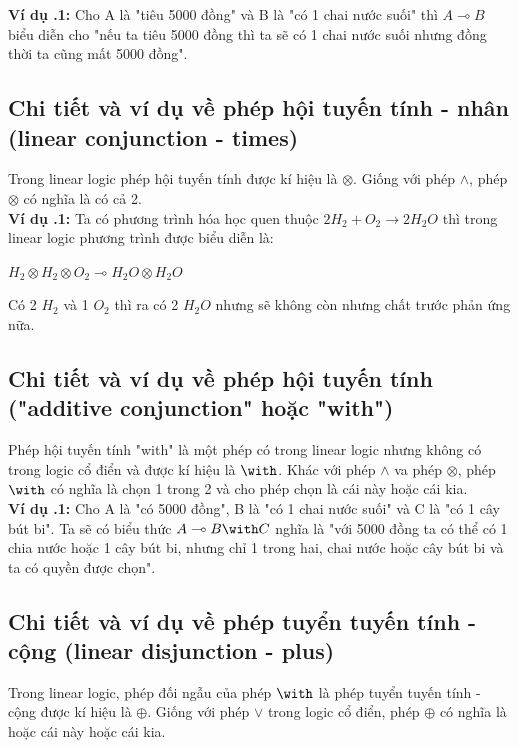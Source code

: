 \documentclass[a4paper]{article}
\begin{document}
\textbf{Ví dụ \thesubsection.1:} Cho A là "tiêu 5000 đồng" và B là "có 1 chai nước suối" thì $A \multimap B$ biểu diễn cho "nếu ta tiêu 5000 đồng thì ta sẽ có 1 chai nước suối nhưng đồng thời ta cũng mất 5000 đồng".

\subsection{Chi tiết và ví dụ về phép hội tuyến tính - nhân (linear conjunction - times)}
Trong linear logic phép hội tuyến tính được kí hiệu là $\otimes$. Giống với phép $\land$, phép $\otimes$ có nghĩa là có cả 2.\\

\textbf{Ví dụ \thesubsection.1:} Ta có phương trình hóa học quen thuộc $2H_2 + O_2 \rightarrow 2H_2O$ thì trong linear logic phương trình được biểu diễn là:
\begin{center}
$H_2 \otimes H_2 \otimes O_2 \multimap H_2O \otimes H_2O$    
\end{center}
Có 2 $H_2$ và 1 $O_2$ thì ra có 2 $H_2O$ nhưng sẽ không còn nhưng chất trước phản ứng nữa.

\subsection{Chi tiết và ví dụ về phép hội tuyến tính ("additive conjunction" hoặc "with")}
Phép hội tuyến tính "with" là một phép có trong linear logic nhưng không có trong logic cổ điển và được kí hiệu là $\with$. Khác với phép $\land$ va phép $\otimes$, phép $\with$ có nghĩa là chọn 1 trong 2 và cho phép chọn là cái này hoặc cái kia.\\

\textbf{Ví dụ \thesubsection.1:} Cho A là "có 5000 đồng", B là "có 1 chai nước suối" và C là "có 1 cây bút bi". Ta sẽ có biểu thức $A \multimap B \with C$ nghĩa là "với 5000 đồng ta có thể có 1 chia nước hoặc 1 cây bút bi, nhưng chỉ 1 trong hai, chai nước hoặc cây bút bi và ta có quyền được chọn".

\subsection{Chi tiết và ví dụ về phép tuyển tuyến tính - cộng (linear disjunction - plus)}
Trong linear logic, phép đối ngẫu của phép $\with$ là phép tuyển tuyến tính - cộng được kí hiệu là $\oplus$. Giống với phép $\lor$ trong logic cổ điển, phép $\oplus$ có nghĩa là hoặc cái này hoặc cái kia.\\
\end{document}
